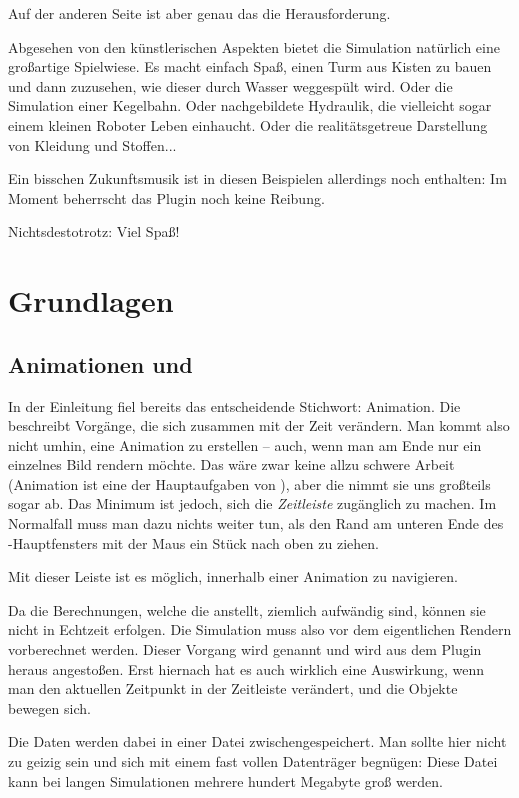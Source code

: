 \documentclass[12pt,a4paper]{scrartcl}
\begin{document}
Auf der anderen Seite ist aber genau das die Herausforderung.

Abgesehen von den künstlerischen Aspekten bietet die Simulation
natürlich eine großartige Spielwiese. Es macht einfach Spaß, einen Turm
aus Kisten zu bauen und dann zuzusehen, wie dieser durch Wasser
weggespült wird. Oder die Simulation einer Kegelbahn. Oder nachgebildete
Hydraulik, die vielleicht sogar einem kleinen Roboter Leben einhaucht.
Oder die realitätsgetreue Darstellung von Kleidung und Stoffen...

Ein bisschen Zukunftsmusik ist in diesen Beispielen allerdings noch
enthalten: Im Moment beherrscht das Plugin noch keine Reibung.

Nichtsdestotrotz: Viel Spaß!

\pagebreak
\section{Grundlagen}
\subsection{Animationen und }
In der Einleitung fiel bereits das entscheidende Stichwort: Animation.
Die \fluidsim beschreibt Vorgänge, die sich zusammen mit der Zeit
verändern. Man kommt also nicht umhin, eine Animation zu erstellen
-- auch, wenn man am Ende nur ein einzelnes Bild rendern möchte. Das
wäre zwar keine allzu schwere Arbeit (Animation ist eine der
Hauptaufgaben von \aoi), aber die \fluidsim nimmt sie uns großteils
sogar ab. Das Minimum ist jedoch, sich die \emph{Zeitleiste} zugänglich
zu machen. Im Normalfall muss man dazu nichts weiter tun, als den Rand
am unteren Ende des \aoi-Hauptfensters mit der Maus ein Stück nach oben
zu ziehen.


Mit dieser Leiste ist es möglich, innerhalb einer Animation zu
navigieren.

Da die Berechnungen, welche die \fluidsim anstellt, ziemlich aufwändig
sind, können sie nicht in Echtzeit erfolgen. Die Simulation muss also
vor dem eigentlichen Rendern vorberechnet werden. Dieser Vorgang wird
 genannt und wird aus dem Plugin heraus angestoßen. Erst
hiernach hat es auch wirklich eine Auswirkung, wenn man den aktuellen
Zeitpunkt in der Zeitleiste verändert, und die Objekte bewegen sich.

Die Daten werden dabei in einer Datei zwischengespeichert. Man sollte
hier nicht zu geizig sein und sich mit einem fast vollen Datenträger
begnügen: Diese Datei kann bei langen Simulationen mehrere hundert
Megabyte groß werden.
\end{document}
